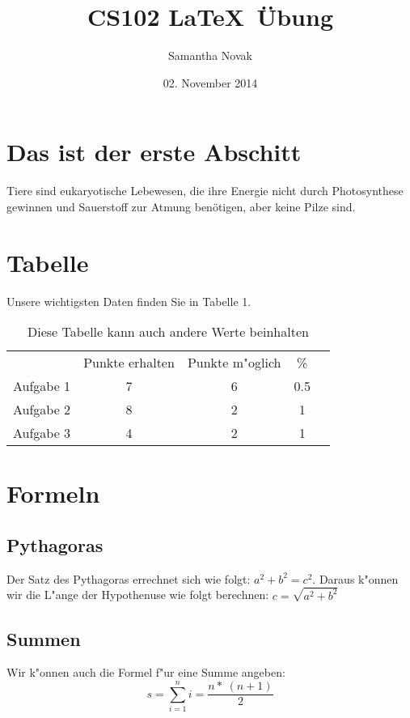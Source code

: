 \documentclass[11pt,a4paper]{article}
\date{02. November 2014}
\author{Samantha Novak}
\title{CS102 \LaTeX \, \"Ubung}
\begin{document}
\maketitle
 \section{Das ist der erste Abschitt}
 Tiere sind eukaryotische Lebewesen, die ihre Energie nicht durch Photosynthese gewinnen und Sauerstoff zur Atmung benötigen, aber keine Pilze sind.
 \section{Tabelle}
 Unsere wichtigsten Daten finden Sie in Tabelle 1.
\begin{table}[h]
\centering
\begin{tabular}{c|c|c|cl}
          & Punkte erhalten & Punkte m"oglich & \%  &  \\ \cline{1-4}
Aufgabe 1 & 7               & 6             & 0.5 &  \\
Aufgabe 2 & 8               & 2              & 1   &  \\
Aufgabe 3 & 4               & 2              & 1   & 
\end{tabular}
\caption{Diese Tabelle kann auch andere Werte beinhalten}
\label{tab:formen}
\end{table}
\section{Formeln}
\subsection{Pythagoras}
Der Satz des Pythagoras errechnet sich wie folgt: $ a^2 + b^2 = c^2 $. Daraus k"onnen wir die L"ange der Hypothenuse wie folgt berechnen:
$ c=\sqrt{a^{2}+b^{2}} $
\subsection{Summen}
Wir k"onnen auch die Formel f"ur eine Summe angeben:
\begin{equation}
s=\sum_{i=1}^n i = \frac{n *\ (n+1)}{2}
\end{equation}
 
 
\end{document}
